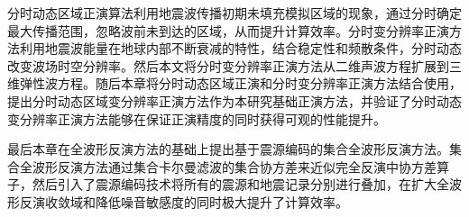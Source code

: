 分时动态区域正演算法利用地震波传播初期未填充模拟区域的现象，通过分时确定最大传播范围，忽略波前未到达的区域，从而提升计算效率。分时变分辨率正演方法利用地震波能量在地球内部不断衰减的特性，结合稳定性和频散条件，分时动态改变波场时空分辨率。然后本文将分时变分辨率正演方法从二维声波方程扩展到三维弹性波方程。随后本章将分时动态区域正演和分时变分辨率正演方法结合使用，提出分时动态区域变分辨率正演方法作为本研究基础正演方法，并验证了分时动态变分辨率正演方法能够在保证正演精度的同时获得可观的性能提升。

最后本章在全波形反演方法的基础上提出基于震源编码的集合全波形反演方法。集合全波形反演方法通过集合卡尔曼滤波的集合协方差来近似完全反演中协方差算子，然后引入了震源编码技术将所有的震源和地震记录分别进行叠加，在扩大全波形反演收敛域和降低噪音敏感度的同时极大提升了计算效率。
